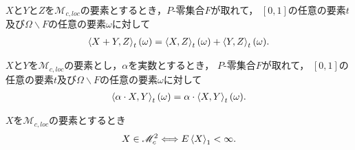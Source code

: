 	\begin{sketch}
	\end{sketch}
	
	\begin{screen}
		\begin{thm}[和の共変分]
			$X$と$Y$と$Z$を$\mathscr{M}_{c,loc}$の要素とするとき，$P$-零集合$F$が取れて，
			$[0,1]$の任意の要素$t$及び$\Omega \backslash F$の任意の要素$\omega$に対して
			\begin{align}
				\inprod<X+Y,Z>_{t}(\omega) 
				= \inprod<X,Z>_{t}(\omega) + \inprod<Y,Z>_{t}(\omega).
			\end{align}
		\end{thm}
	\end{screen}
	
	\begin{sketch}
	\end{sketch}
	
	\begin{screen}
		\begin{thm}[スカラ倍の共変分]
			$X$と$Y$を$\mathscr{M}_{c,loc}$の要素とし，$\alpha$を実数とするとき，
			$P$-零集合$F$が取れて，
			$[0,1]$の任意の要素$t$及び$\Omega \backslash F$の任意の要素$\omega$に対して
			\begin{align}
				\inprod<\alpha \cdot X,Y>_{t}(\omega) = \alpha \cdot \inprod<X,Y>_{t}(\omega).
			\end{align}
		\end{thm}
	\end{screen}
	
	\begin{sketch}
	\end{sketch}
	
	\begin{screen}
		\begin{thm}[二乗可積分マルチンゲールの二次変分は可積分]
		\label{thm:square_integrable_iff_quadratic_variation_integrable}
			$X$を$\mathscr{M}_{c,loc}$の要素とするとき
			\begin{align}
				X \in \mathscr{M}_{c}^{2} \Longleftrightarrow E\inprod<X>_{1} < \infty.
			\end{align}
		\end{thm}
	\end{screen}
	
